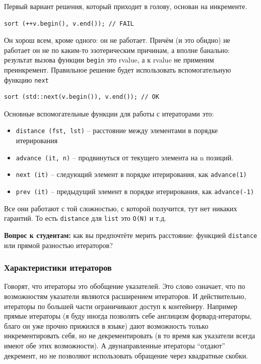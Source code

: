 \documentclass[a4paper,12pt,oneside]{article}
\newif\ifanswers
\begin{document}
Первый вариант решения, который приходит в голову, основан на инкременте.

\begin{lstlisting}
sort (++v.begin(), v.end()); // FAIL
\end{lstlisting}

Он хорош всем, кроме одного: он не работает. Причём (и это обидно) не работает он не по каким-то эзотерическим причинам, а вполне банально: результат вызова функции \lstinline!begin! это rvalue, а к rvalue не применим преинкремент. Правильное решение будет использовать вспомогательную функцию \lstinline!next!

\begin{lstlisting}
sort (std::next(v.begin()), v.end()); // OK
\end{lstlisting}

Основные вспомогательные функции для работы с итераторами это:

\begin{itemize}
\item \lstinline!distance (fst, lst)! – расстояние между элементами в порядке итерирования
\item \lstinline!advance (it, n)! – продвинуться от текущего элемента на n позиций.
\item \lstinline!next (it)! – следующий элемент в порядке итерирования, как \lstinline!advance(1)!
\item \lstinline!prev (it)! – предыдущий элемент в порядке итерирования, как \lstinline!advance(-1)!
\end{itemize}

Все они работают с той сложностью, с которой получится, тут нет никаких гарантий. То есть \lstinline!distance! для \lstinline!list! это \lstinline!O(N)! и т.д.

\textbf{Вопрос к студентам:} как вы предпочтёте мерить расстояние: функцией \lstinline!distance! или прямой разностью итераторов?

\ifanswers
Тут нет единого рецепта: если важно гарантировать константную сложность или ошибку компиляции тогда разностью. А если важно, чтобы всегда работало, тогда вспомогательной функцией.
\fi

\subsubsection{Характеристики итераторов}\label{subsub:itertraits}

Говорят, что итераторы это обобщение указателей. Это слово означает, что по возможностям указатели являются расширением итераторов. И действительно, итераторы по большей части ограничивают доступ к контейнеру. Например прямые итераторы (я буду иногда позволять себе англицизм форвард-итераторы, благо он уже прочно прижился в языке) дают возможность только инкрементировать себя, но не декрементировать (в то время как указатели всегда имеют обе этих возможности). А двунаправленные итераторы ``отдают'' декремент, но не позволяют использовать обращение через квадратные скобки.
\end{document}
